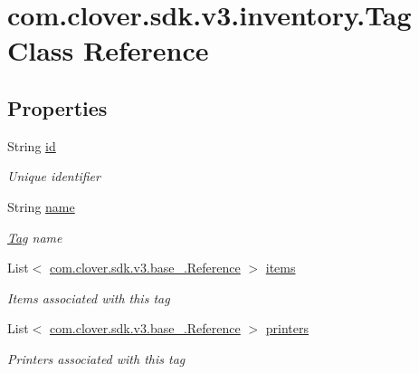 \hypertarget{classcom_1_1clover_1_1sdk_1_1v3_1_1inventory_1_1_tag}{}\section{com.\+clover.\+sdk.\+v3.\+inventory.\+Tag Class Reference}
\label{classcom_1_1clover_1_1sdk_1_1v3_1_1inventory_1_1_tag}
\subsection*{Properties}
\begin{DoxyCompactItemize}
\item 
String \hyperlink{classcom_1_1clover_1_1sdk_1_1v3_1_1inventory_1_1_tag_af29bc4cca69bdbfdd7b6534938353027}{id}
\begin{DoxyCompactList}\small\item\em Unique identifier \end{DoxyCompactList}\item 
String \hyperlink{classcom_1_1clover_1_1sdk_1_1v3_1_1inventory_1_1_tag_a76027ac5f4401863de1d8ad2264bec1a}{name}
\begin{DoxyCompactList}\small\item\em \hyperlink{classcom_1_1clover_1_1sdk_1_1v3_1_1inventory_1_1_tag}{Tag} name \end{DoxyCompactList}\item 
List$<$ \hyperlink{classcom_1_1clover_1_1sdk_1_1v3_1_1base___1_1_reference}{com.\+clover.\+sdk.\+v3.\+base\+\_\+.\+Reference} $>$ \hyperlink{classcom_1_1clover_1_1sdk_1_1v3_1_1inventory_1_1_tag_a83913435b5cd4f5c46f0a05c44ec1c37}{items}
\begin{DoxyCompactList}\small\item\em Items associated with this tag \end{DoxyCompactList}\item 
List$<$ \hyperlink{classcom_1_1clover_1_1sdk_1_1v3_1_1base___1_1_reference}{com.\+clover.\+sdk.\+v3.\+base\+\_\+.\+Reference} $>$ \hyperlink{classcom_1_1clover_1_1sdk_1_1v3_1_1inventory_1_1_tag_a438066f64ef237f00ee7af37f43e9674}{printers}
\begin{DoxyCompactList}\small\item\em Printers associated with this tag \end{DoxyCompactList}\end{DoxyCompactItemize}


